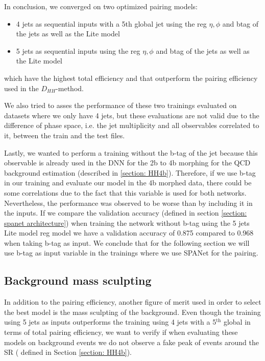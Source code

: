 \clearpage

\noindent In conclusion, we converged on two optimized pairing models:

\begin{itemize} [itemsep=0.1em]
    \item 4 jets as sequential inputs with a 5th global jet using the \pt reg $\eta, \phi$ and btag of the jets as well as the Lite model
    \item 5 jets as sequential inputs using the \pt reg $\eta, \phi$ and btag of the jets as well as the Lite model
\end{itemize}

\noindent which have the highest total efficiency and that outperform the pairing efficiency used in the $D_{HH}$-method.

We also tried to asses the performance of these two trainings evaluated on datasets where we only have 4 jets, but these evaluations are not valid due to the difference of phase space, i.e. the jet multiplicity and all observables correlated to it, between the train and the test files.  

Lastly, we wanted to perform a training without the b-tag of the jet because this observable is already used in the DNN for the 2b to 4b morphing for the QCD background estimation (described in \ref{section: HH4b}). Therefore, if we use b-tag in our training and evaluate our model in the 4b morphed data, there could be some correlations due to the fact that this variable is used for both networks. Nevertheless, the performance was observed to be worse than by including it in the inputs. If we compare the validation accuracy (defined in section \ref{section: spanet architecture}) when training the network without b-tag using the 5 jets Lite model \pt reg model we have a validation accuracy of 0.875 compared to 0.968 when taking b-tag as input. We conclude that for the following section we will use b-tag as input variable in the trainings where we use SPANet for the pairing.

\clearpage

\subsection{Background mass sculpting} \label{subsection: bckg mass sculpting}
In addition to the pairing efficiency, another figure of merit used in order to select the best model is the mass sculpting of the background.  Even though the training using 5 jets as inputs outperforms the training using 4 jets with a 5$^{\text{th}}$ global in terms of total pairing efficiency, we want to verify if when evaluating these models on background events we do not observe a fake peak of events around the SR ( defined in Section \ref{section: HH4b}). 

